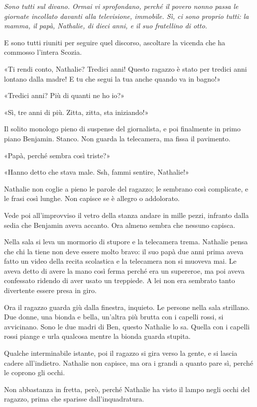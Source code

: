 \documentclass[a4paper,10pt]{memoir}
\begin{document}
{\itshape
Sono tutti sul divano. Ormai vi sprofondano, perché il povero nonno passa le giornate incollato davanti alla
televisione, immobile. Sì, ci sono proprio tutti: la mamma, il papà, Nathalie, di dieci anni, e il suo fratellino di
otto.

E sono tutti riuniti per seguire quel discorso, ascoltare la vicenda che ha commosso l’intera Scozia.

«Ti rendi conto, Nathalie? Tredici anni! Questo ragazzo è stato per tredici anni lontano dalla madre! E tu che segui la
tua anche quando va in bagno!»

«Tredici anni? Più di quanti ne ho io?»

«Sì, tre anni di più. Zitta, zitta, sta iniziando!»

Il solito monologo pieno di suspense del giornalista, e poi finalmente in primo piano Benjamin. Stanco. Non guarda la
telecamera, ma fissa il pavimento.

«Papà, perché sembra così triste?»

«Hanno detto che stava male. Ssh, fammi sentire, Nathalie!»

Nathalie non coglie a pieno le parole del ragazzo; le sembrano così complicate, e le frasi così lunghe. Non capisce se è
allegro o addolorato.

Vede poi all’improvviso il vetro della stanza andare in mille pezzi, infranto dalla sedia che Benjamin aveva accanto.
Ora almeno sembra che nessuno capisca.

Nella sala si leva un mormorio di stupore e la telecamera trema. Nathalie pensa che chi la tiene non deve essere molto
bravo: il suo papà due anni prima aveva fatto un video della recita scolastica e la telecamera non si muoveva mai. Le
aveva detto di avere la mano così ferma perché era un supereroe, ma poi aveva confessato ridendo di aver usato un
treppiede. A lei non era sembrato tanto divertente essere presa in giro.

Ora il ragazzo guarda giù dalla finestra, inquieto. Le persone nella sala strillano. Due donne, una bionda e bella,
un’altra più brutta con i capelli rossi, si avvicinano. Sono le due madri di Ben, questo Nathalie lo sa. Quella con i
capelli rossi piange e urla qualcosa mentre la bionda guarda stupita.

Qualche interminabile istante, poi il ragazzo si gira verso la gente, e si lascia cadere all’indietro. Nathalie non
capisce, ma ora i grandi a quanto pare sì, perché le coprono gli occhi.

Non abbastanza in fretta, però, perché Nathalie ha visto il lampo negli occhi del ragazzo, prima che sparisse
dall’inquadratura.
\/}

\clearpage

\tableofcontents
\end{document}
